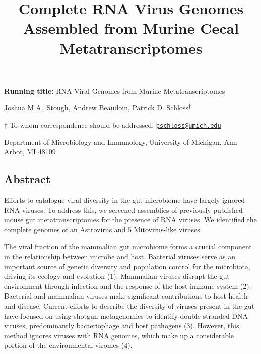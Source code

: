 \documentclass[11pt,]{article}
\title{\textbf{Complete RNA Virus Genomes Assembled from Murine Cecal
Metatranscriptomes}}
\author{}
\date{}
\begin{document}
\maketitle

\vspace{35mm}

\textbf{Running title:} RNA Viral Genomes from Murine Metatranscriptomes

\vspace{35mm}

Joshua M.A.~Stough, Andrew Beaudoin, Patrick D.
Schloss\textsuperscript{\(\dagger\)}

\vspace{40mm}

\(\dagger\) To whom correspondence should be addressed:
\href{mailto:pschloss@umich.edu}{\nolinkurl{pschloss@umich.edu}}

Department of Microbiology and Immunology, University of Michigan, Ann
Arbor, MI 48109

\newpage
\linenumbers

\hypertarget{abstract}{%
\subsection{Abstract}\label{abstract}}

Efforts to catalogue viral diversity in the gut microbiome have largely
ignored RNA viruses. To address this, we screened assemblies of
previously published mouse gut metatranscriptomes for the presence of
RNA viruses. We identified the complete genomes of an Astrovirus and 5
Mitovirus-like viruses.

\newpage

The viral fraction of the mammalian gut microbiome forms a crucial
component in the relationship between microbe and host. Bacterial
viruses serve as an important source of genetic diversity and population
control for the microbiota, driving its ecology and evolution (1).
Mammalian viruses disrupt the gut environment through infection and the
response of the host immune system (2). Bacterial and mammalian viruses
make significant contributions to host health and disease. Current
efforts to describe the diversity of viruses present in the gut have
focused on using shotgun metagenomics to identify double-stranded DNA
viruses, predominantly bacteriophage and host pathogens (3). However,
this method ignores viruses with RNA genomes, which make up a
considerable portion of the environmental viromes (4).
\end{document}
